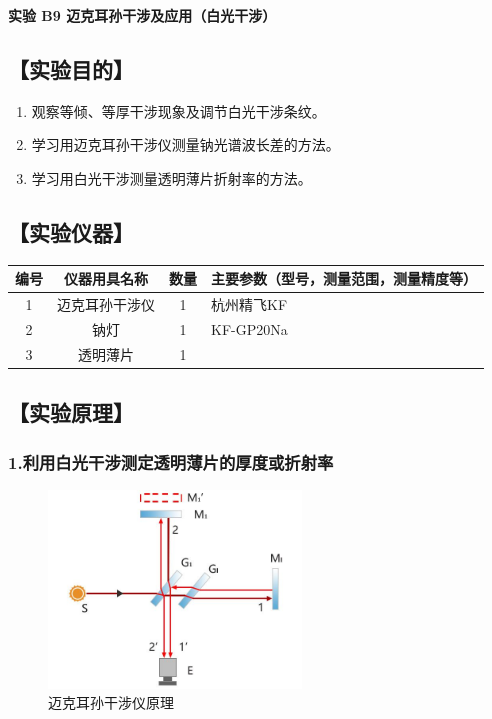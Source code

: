\documentclass[12pt,a4paper,UTF8]{ctexart}
\begin{document}

\begin{center}
\LARGE\textbf{实验 B9 迈克耳孙干涉及应用（白光干涉）}
\end{center}




\subsection*{【实验目的】}
	\begin{enumerate}
		\item 观察等倾、等厚干涉现象及调节白光干涉条纹。
        \item 学习用迈克耳孙干涉仪测量钠光谱波长差的方法。
        \item 学习用白光干涉测量透明薄片折射率的方法。
	\end{enumerate}

\subsection*{【实验仪器】}
\begin{table}[htbp]
	\centering
	\begin{tabular}{cccp{20em}}
	\toprule
	编号    & 仪器用具名称 & 数量    & 主要参数（型号，测量范围，测量精度等） \\
	\midrule
	1     & 迈克耳孙干涉仪 & 1     &杭州精飞KF \\
	2     &钠灯 & 1 & KF-GP20Na \\
	3     & 透明薄片 & 1 & \\
	\bottomrule
	\end{tabular}%
	\label{tab:device}%
\end{table}%

\subsection*{【实验原理】}
\subsubsection*{1.利用白光干涉测定透明薄片的厚度或折射率}

\begin{figure}[htbp]
	\centering
	\includegraphics[width=0.6\textwidth]{img//1.jpg}
	\caption{迈克耳孙干涉仪原理}
\end{figure}
\end{document}
